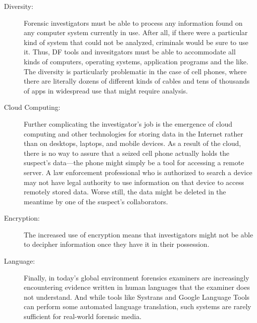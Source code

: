 \begin{description}
\item[Diversity:] Forensic investigators must be able to process any
  information found on any computer system currently in use. After
  all, if there were a particular kind of system that could not be
  analyzed, criminals would be sure to use it. Thus, DF tools and
  invesitgators must be able to accommodate all kinds of computers,
  operating systems, application programs and the like. The diversity
  is particularly problematic in the case of cell phones, where there
  are literally dozens of different kinds of cables and tens of
  thousands of apps in widespread use that might require analysis.

\item[Cloud Computing:] Further complicating the investigator's job is
  the emergence of cloud computing and other technologies for storing
  data in the Internet rather than on desktops, laptops, and mobile
  devices. As a result of the cloud, there is no way to assure that a
  seized cell phone actually holds the suspect's data---the phone
  might simply be a tool for accessing a remote server. A law
  enforcement professional who is authorized to search a device may
  not have legal authority to use information on that device to access
  remotely stored data. Worse still, the data might be deleted in the
  meantime by one of the suspect's collaborators.

\item[Encryption:] The increased use of encryption means that
  investigators might not be able to decipher information once they
  have it in their possession. 

\item[Language:] Finally, in today's global environment forensics
  examiners are increasingly encountering evidence written in human
  languages that the examiner does not understand. And while tools
  like Systrans and Google Language Tools can perform some automated
  language translation, such systems are rarely sufficient for
  real-world forensic media.

\end{description}

